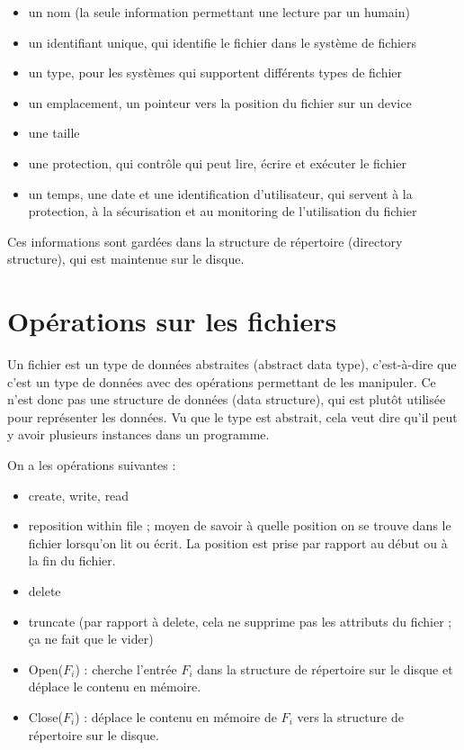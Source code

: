 \begin{itemize}
	\item un nom (la seule information permettant une lecture par un humain)
	\item un identifiant unique, qui identifie le fichier dans le système de fichiers
	\item un type, pour les systèmes qui supportent différents types de fichier
	\item un emplacement, un pointeur vers la position du fichier sur un device
	\item une taille
	\item une protection, qui contrôle qui peut lire, écrire et exécuter le fichier
	\item un temps, une date et une identification d'utilisateur, qui servent à la protection, à la sécurisation et au monitoring de l'utilisation du fichier
\end{itemize}

Ces informations sont gardées dans la structure de répertoire (directory structure), qui est maintenue sur le disque.

\section{Opérations sur les fichiers}

Un fichier est un type de données abstraites (abstract data type), c'est-à-dire que c'est un type de données avec des opérations permettant de les manipuler. Ce n'est donc pas une structure de données (data structure), qui est plutôt utilisée pour représenter les données. Vu que le type est abstrait, cela veut dire qu'il peut y avoir plusieurs instances dans un programme.

On a les opérations suivantes :

\begin{itemize}
	\item create, write, read
	\item reposition within file ; moyen de savoir à quelle position on se trouve dans le fichier lorsqu'on lit ou écrit. La position est prise par rapport au début ou à la fin du fichier.
	\item delete
	\item truncate (par rapport à delete, cela ne supprime pas les attributs du fichier ; ça ne fait que le vider)
	\item Open($F_i$) : cherche l'entrée $F_i$ dans la structure de répertoire sur le disque et déplace le contenu en mémoire.
	
	\item Close($F_i$) : déplace le contenu en mémoire de $F_i$ vers la structure de répertoire sur le disque.
\end{itemize}

